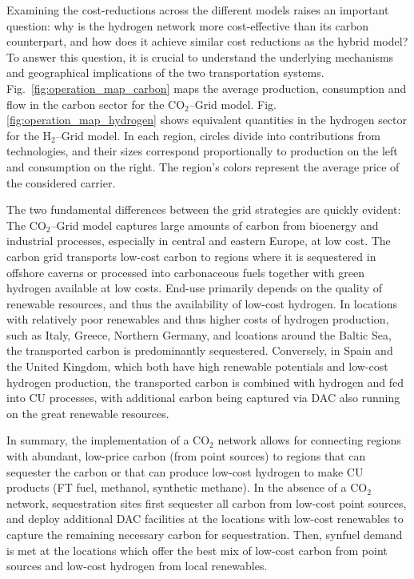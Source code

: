 \documentclass[twocolumn]{article}
\newcommand{\carbon}{CO$_2$}
\newcommand{\hydrogen}{H$_2$}
\newcommand{\carbongrid}{\carbon{}--Grid}
\newcommand{\hydrogengrid}{\hydrogen{}--Grid}
\begin{document}
Examining the cost-reductions across the different models raises an important question: why is the hydrogen network more cost-effective than its carbon counterpart, and how does it achieve similar cost reductions as the hybrid model? To answer this question, it is crucial to understand the underlying mechanisms and geographical implications of the two transportation systems. Fig.~\ref{fig:operation_map_carbon} maps the average production, consumption and flow in the carbon sector for the \carbongrid{} model. Fig. \ref{fig:operation_map_hydrogen} shows equivalent quantities in the hydrogen sector for the \hydrogengrid{} model. In each region, circles divide into contributions from technologies, and their sizes correspond proportionally to production on the left and consumption on the right. The region's colors represent the average price of the considered carrier.

The two fundamental differences between the grid strategies are quickly evident: The \carbongrid{} model captures large amounts of carbon from bioenergy and industrial processes, especially in central and eastern Europe, at low cost. The carbon grid transports low-cost carbon to regions where it is sequestered in offshore caverns or processed into carbonaceous fuels together with green hydrogen available at low costs. End-use primarily depends on the quality of renewable resources, and thus the availability of low-cost hydrogen. In locations with relatively poor renewables and thus higher costs of hydrogen production, such as Italy, Greece, Northern Germany, and lcoations around the Baltic Sea, the transported carbon is predominantly sequestered. Conversely, in Spain and the United Kingdom, which both have high renewable potentials and low-cost hydrogen production, the transported carbon is combined with hydrogen and fed into CU processes, with additional carbon being captured via DAC also running on the great renewable resources.

In summary, the implementation of a \carbon{} network allows for connecting regions with abundant, low-price carbon (from point sources) to regions that can sequester the carbon or that can produce low-cost hydrogen to make CU products (FT fuel, methanol, synthetic methane). In the absence of a \carbon{} network, sequestration sites first sequester all carbon from low-cost point sources, and deploy additional DAC facilities at the locations with low-cost renewables to capture the remaining necessary carbon for sequestration. Then, synfuel demand is met at the locations which offer the best mix of low-cost carbon from point sources and low-cost hydrogen from local renewables.
\end{document}
